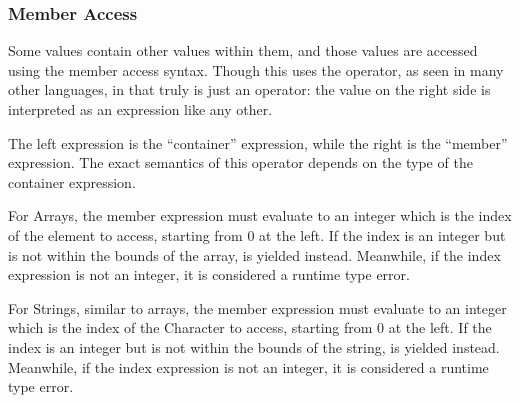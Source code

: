 \subsubsection{Member Access}
\label{sec:member-access}

Some values contain other values within them, and those values are accessed using
the member access syntax. Though this uses the  operator, as seen in many
other languages, in \Trilogy{} that  truly is just an operator: the value on
the right side is interpreted as an expression like any other.

\begin{bnf*}
\end{bnf*}

The left expression is the ``container'' expression, while the right is the
``member'' expression. The exact semantics of this operator depends on the
type of the container expression.

For Arrays, the member expression must evaluate to an integer
which is the index of the element to access, starting from 0 at the left.
If the index is an integer but is not within the bounds of the array,
 is yielded instead. Meanwhile, if the index expression is
not an integer, it is considered a runtime type error.

\begin{prooftree}
\end{prooftree}

\begin{prooftree}
\end{prooftree}

For Strings, similar to arrays, the member expression must evaluate
to an integer which is the index of the Character to access, starting from 0
at the left. If the index is an integer but is not within the bounds of the
string,  is yielded instead. Meanwhile, if the index expression
is not an integer, it is considered a runtime type error.


